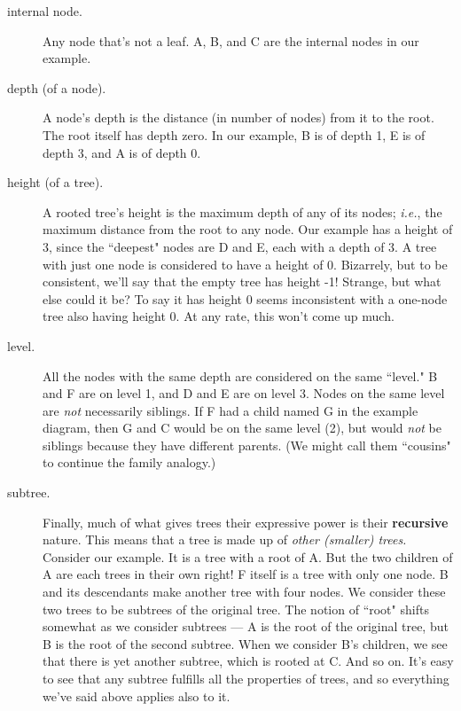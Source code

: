 \begin{description}
\item[internal node.] Any node that's not a leaf. A, B, and C are the
internal nodes in our example.

\item[depth (of a node).] A node's depth is the distance (in number of
nodes) from it to the root. The root itself has depth zero. In our example,
B is of depth 1, E is of depth 3, and A is of depth 0.

\item[height (of a tree).] A rooted tree's height is the maximum depth of
any of its nodes; \textit{i.e.}, the maximum distance from the root to any
node. Our example has a height of 3, since the ``deepest" nodes are D and
E, each with a depth of 3. A tree with just one node is considered to have
a height of 0. Bizarrely, but to be consistent, we'll say that the empty
tree has height -1! Strange, but what else could it be? To say it has
height 0 seems inconsistent with a one-node tree also having height 0. At
any rate, this won't come up much.

\item[level.] All the nodes with the same depth are considered on the same
``level." B and F are on level 1, and D and E are on level 3. Nodes on the
same level are \textit{not} necessarily siblings. If F had a child named G
in the example diagram, then G and C would be on the same level (2), but
would \textit{not} be siblings because they have different parents. (We
might call them ``cousins" to continue the family analogy.)

\item[subtree.] \label{recursion} Finally, much of what gives trees their
expressive power is their \textbf{recursive} nature. This means that a tree
is made up of \textit{other (smaller) trees.} Consider our example. It is a
tree with a root of A. But the two children of A are each trees in their
own right! F itself is a tree with only one node. B and its descendants
make another tree with four nodes. We consider these two trees to be
subtrees of the original tree. The notion of ``root" shifts somewhat as we
consider subtrees --- A is the root of the original tree, but B is the root
of the second subtree. When we consider B's children, we see that there is
yet another subtree, which is rooted at C. And so on. It's easy to see that
any subtree fulfills all the properties of trees, and so everything we've
said above applies also to it.

\end{description}

